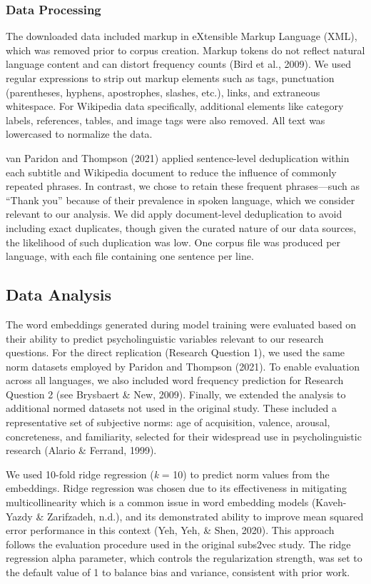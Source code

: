 \documentclass[
  english,
  man,floatsintext]{apa6}
\begin{document}
\subsubsection{Data Processing}\label{data-processing}

The downloaded data included markup in eXtensible Markup Language (XML), which was removed prior to corpus creation. Markup tokens do not reflect natural language content and can distort frequency counts (Bird et al., 2009). We used regular expressions to strip out markup elements such as tags, punctuation (parentheses, hyphens, apostrophes, slashes, etc.), links, and extraneous whitespace. For Wikipedia data specifically, additional elements like category labels, references, tables, and image tags were also removed. All text was lowercased to normalize the data.

van Paridon and Thompson (2021) applied sentence-level deduplication within each subtitle and Wikipedia document to reduce the influence of commonly repeated phrases. In contrast, we chose to retain these frequent phrases---such as ``Thank you'' because of their prevalence in spoken language, which we consider relevant to our analysis. We did apply document-level deduplication to avoid including exact duplicates, though given the curated nature of our data sources, the likelihood of such duplication was low. One corpus file was produced per language, with each file containing one sentence per line.

\subsection{Data Analysis}\label{data-analysis}

The word embeddings generated during model training were evaluated based on their ability to predict psycholinguistic variables relevant to our research questions. For the direct replication (Research Question 1), we used the same norm datasets employed by Paridon and Thompson (2021). To enable evaluation across all languages, we also included word frequency prediction for Research Question 2 (see Brysbaert \& New, 2009). Finally, we extended the analysis to additional normed datasets not used in the original study. These included a representative set of subjective norms: age of acquisition, valence, arousal, concreteness, and familiarity, selected for their widespread use in psycholinguistic research (Alario \& Ferrand, 1999).

We used 10-fold ridge regression (\emph{k} = 10) to predict norm values from the embeddings. Ridge regression was chosen due to its effectiveness in mitigating multicollinearity which is a common issue in word embedding models (Kaveh-Yazdy \& Zarifzadeh, n.d.), and its demonstrated ability to improve mean squared error performance in this context (Yeh, Yeh, \& Shen, 2020). This approach follows the evaluation procedure used in the original subs2vec study. The ridge regression alpha parameter, which controls the regularization strength, was set to the default value of 1 to balance bias and variance, consistent with prior work.
\end{document}
